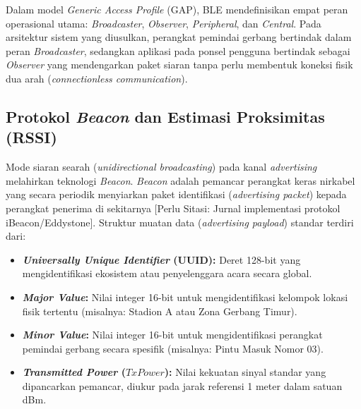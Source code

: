 Dalam model \textit{Generic Access Profile} (GAP), BLE mendefinisikan empat peran operasional utama: \textit{Broadcaster}, \textit{Observer}, \textit{Peripheral}, dan \textit{Central}. Pada arsitektur sistem yang diusulkan, perangkat pemindai gerbang bertindak dalam peran \textit{Broadcaster}, sedangkan aplikasi pada ponsel pengguna bertindak sebagai \textit{Observer} yang mendengarkan paket siaran tanpa perlu membentuk koneksi fisik dua arah (\textit{connectionless communication}).

\subsection{Protokol \textit{Beacon} dan Estimasi Proksimitas (RSSI)}
Mode siaran searah (\textit{unidirectional broadcasting}) pada kanal \textit{advertising} melahirkan teknologi \textit{Beacon}. \textit{Beacon} adalah pemancar perangkat keras nirkabel yang secara periodik menyiarkan paket identifikasi (\textit{advertising packet}) kepada perangkat penerima di sekitarnya [Perlu Sitasi: Jurnal implementasi protokol iBeacon/Eddystone]. Struktur muatan data (\textit{advertising payload}) standar terdiri dari:
\begin{itemize}
    \item \textbf{\textit{Universally Unique Identifier} (UUID):} Deret 128-bit yang mengidentifikasi ekosistem atau penyelenggara acara secara global.
    \item \textbf{\textit{Major Value}:} Nilai integer 16-bit untuk mengidentifikasi kelompok lokasi fisik tertentu (misalnya: Stadion A atau Zona Gerbang Timur).
    \item \textbf{\textit{Minor Value}:} Nilai integer 16-bit untuk mengidentifikasi perangkat pemindai gerbang secara spesifik (misalnya: Pintu Masuk Nomor 03).
    \item \textbf{\textit{Transmitted Power} ($TxPower$):} Nilai kekuatan sinyal standar yang dipancarkan pemancar, diukur pada jarak referensi 1 meter dalam satuan dBm.
\end{itemize}

